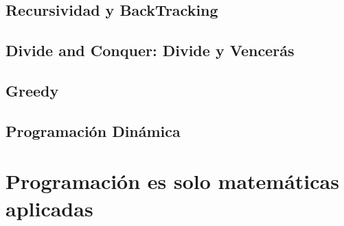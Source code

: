 \documentclass[12pt, fleqn]{report}                             %
\theoremstyle{break}                                            %
\begin{document}
\clearpage
\chapter{Recursividad y BackTracking}

\clearpage
\chapter{Divide and Conquer: Divide y Vencerás}


\clearpage
\chapter{Greedy}

\clearpage
\chapter{Programación Dinámica}



\part{Programación es solo matemáticas aplicadas}

    \clearpage
\end{document}
